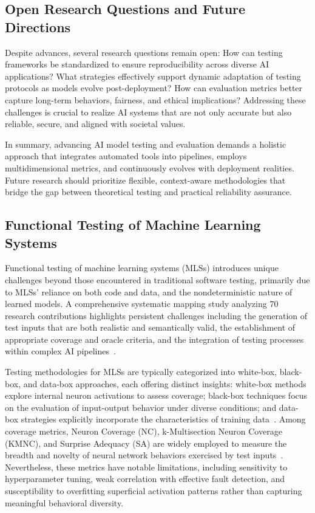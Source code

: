 \documentclass[sigconf]{acmart}
\begin{document}
\subsection{Open Research Questions and Future Directions}

Despite advances, several research questions remain open: How can testing frameworks be standardized to ensure reproducibility across diverse AI applications? What strategies effectively support dynamic adaptation of testing protocols as models evolve post-deployment? How can evaluation metrics better capture long-term behaviors, fairness, and ethical implications? Addressing these challenges is crucial to realize AI systems that are not only accurate but also reliable, secure, and aligned with societal values.

In summary, advancing AI model testing and evaluation demands a holistic approach that integrates automated tools into pipelines, employs multidimensional metrics, and continuously evolves with deployment realities. Future research should prioritize flexible, context-aware methodologies that bridge the gap between theoretical testing and practical reliability assurance.

\subsection{Functional Testing of Machine Learning Systems}

Functional testing of machine learning systems (MLSs) introduces unique challenges beyond those encountered in traditional software testing, primarily due to MLSs’ reliance on both code and data, and the nondeterministic nature of learned models. A comprehensive systematic mapping study analyzing 70 research contributions highlights persistent challenges including the generation of test inputs that are both realistic and semantically valid, the establishment of appropriate coverage and oracle criteria, and the integration of testing processes within complex AI pipelines~\cite{ref27}.

Testing methodologies for MLSs are typically categorized into white-box, black-box, and data-box approaches, each offering distinct insights: white-box methods explore internal neuron activations to assess coverage; black-box techniques focus on the evaluation of input-output behavior under diverse conditions; and data-box strategies explicitly incorporate the characteristics of training data~\cite{ref27}. Among coverage metrics, Neuron Coverage (NC), k-Multisection Neuron Coverage (KMNC), and Surprise Adequacy (SA) are widely employed to measure the breadth and novelty of neural network behaviors exercised by test inputs~\cite{ref3}. Nevertheless, these metrics have notable limitations, including sensitivity to hyperparameter tuning, weak correlation with effective fault detection, and susceptibility to overfitting superficial activation patterns rather than capturing meaningful behavioral diversity.
\end{document}

